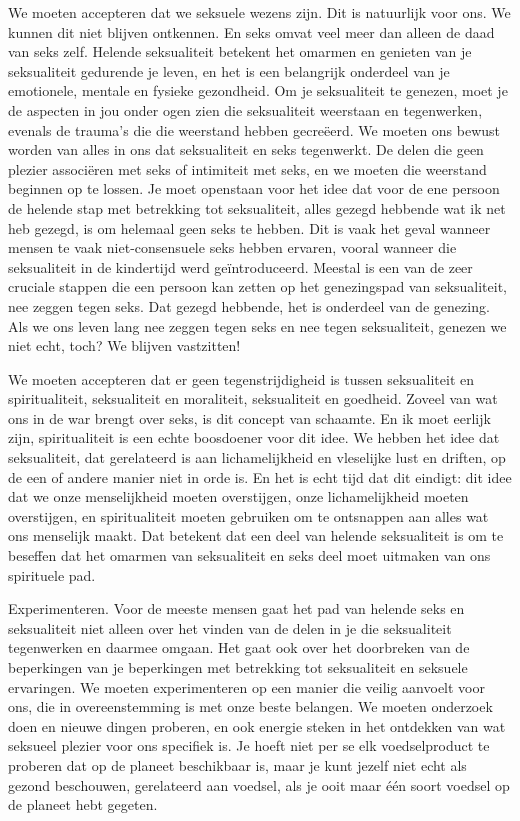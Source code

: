 We moeten accepteren dat we seksuele wezens zijn. Dit is natuurlijk voor ons. We kunnen dit niet blijven ontkennen. En seks omvat veel meer dan alleen de daad van seks zelf. Helende seksualiteit betekent het omarmen en genieten van je seksualiteit gedurende je leven, en het is een belangrijk onderdeel van je emotionele, mentale en fysieke gezondheid. Om je seksualiteit te genezen, moet je de aspecten in jou onder ogen zien die seksualiteit weerstaan en tegenwerken, evenals de trauma's die die weerstand hebben gecreëerd. We moeten ons bewust worden van alles in ons dat seksualiteit en seks tegenwerkt. De delen die geen plezier associëren met seks of intimiteit met seks, en we moeten die weerstand beginnen op te lossen. Je moet openstaan voor het idee dat voor de ene persoon de helende stap met betrekking tot seksualiteit, alles gezegd hebbende wat ik net heb gezegd, is om helemaal geen seks te hebben. Dit is vaak het geval wanneer mensen te vaak niet-consensuele seks hebben ervaren, vooral wanneer die seksualiteit in de kindertijd werd geïntroduceerd. Meestal is een van de zeer cruciale stappen die een persoon kan zetten op het genezingspad van seksualiteit, nee zeggen tegen seks. Dat gezegd hebbende, het is onderdeel van de genezing. Als we ons leven lang nee zeggen tegen seks en nee tegen seksualiteit, genezen we niet echt, toch? We blijven vastzitten!

We moeten accepteren dat er geen tegenstrijdigheid is tussen seksualiteit en spiritualiteit, seksualiteit en moraliteit, seksualiteit en goedheid. Zoveel van wat ons in de war brengt over seks, is dit concept van schaamte. En ik moet eerlijk zijn, spiritualiteit is een echte boosdoener voor dit idee. We hebben het idee dat seksualiteit, dat gerelateerd is aan lichamelijkheid en vleselijke lust en driften, op de een of andere manier niet in orde is. En het is echt tijd dat dit eindigt: dit idee dat we onze menselijkheid moeten overstijgen, onze lichamelijkheid moeten overstijgen, en spiritualiteit moeten gebruiken om te ontsnappen aan alles wat ons menselijk maakt. Dat betekent dat een deel van helende seksualiteit is om te beseffen dat het omarmen van seksualiteit en seks deel moet uitmaken van ons spirituele pad.

Experimenteren. Voor de meeste mensen gaat het pad van helende seks en seksualiteit niet alleen over het vinden van de delen in je die seksualiteit tegenwerken en daarmee omgaan. Het gaat ook over het doorbreken van de beperkingen van je beperkingen met betrekking tot seksualiteit en seksuele ervaringen. We moeten experimenteren op een manier die veilig aanvoelt voor ons, die in overeenstemming is met onze beste belangen. We moeten onderzoek doen en nieuwe dingen proberen, en ook energie steken in het ontdekken van wat seksueel plezier voor ons specifiek is. Je hoeft niet per se elk voedselproduct te proberen dat op de planeet beschikbaar is, maar je kunt jezelf niet echt als gezond beschouwen, gerelateerd aan voedsel, als je ooit maar één soort voedsel op de planeet hebt gegeten.

